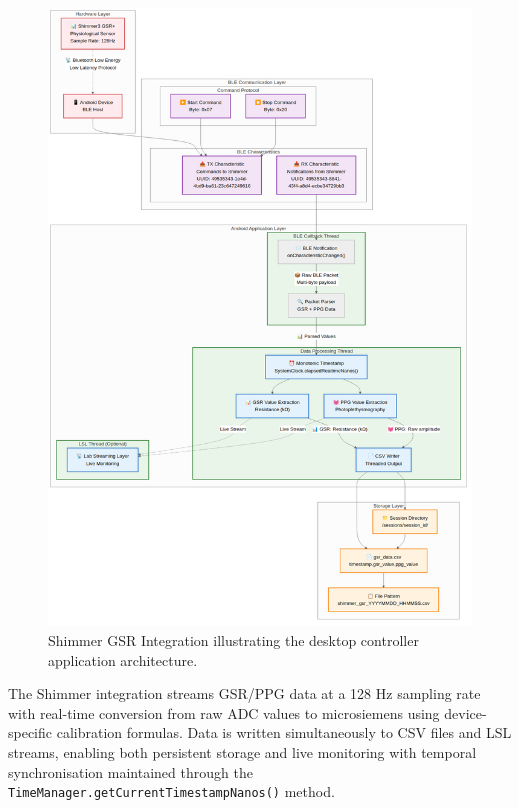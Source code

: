 \begin{figure}[htbp]
    \centring
    \includegraphics[width=\textwidth]{../diagrams/fig_4_03_shimmer_gsr_integration.png}
    \caption{Shimmer GSR Integration illustrating the desktop controller application architecture.}
    \label{fig:4_03_shimmer_gsr_integration}
\end{figure}

The Shimmer integration streams GSR/PPG data at a 128 Hz sampling rate with real-time conversion from raw ADC values to microsiemens using device-specific calibration formulas. Data is written simultaneously to CSV files and LSL streams, enabling both persistent storage and live monitoring with temporal synchronisation maintained through the \texttt{TimeManager.getCurrentTimestampNanos()} method.


